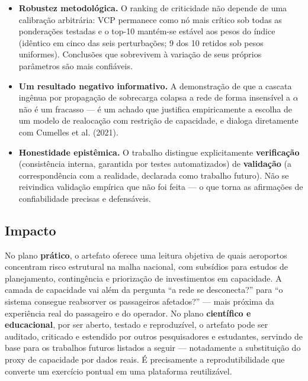 \documentclass[12pt,a4paper]{article}
\begin{document}
\begin{itemize}[leftmargin=*]
  \item \textbf{Robustez metodológica.} O ranking de criticidade não depende de uma calibração
        arbitrária: VCP permanece como nó mais crítico sob todas as ponderações testadas e o top-10
        mantém-se estável aos pesos do índice (idêntico em cinco das seis perturbações; 9 dos 10
        retidos sob pesos uniformes). Conclusões que sobrevivem à variação de seus próprios
        parâmetros são mais confiáveis.
  \item \textbf{Um resultado negativo informativo.} A demonstração de que a cascata ingênua por
        propagação de sobrecarga colapsa a rede de forma insensível a $\alpha$ não é um fracasso
        --- é um achado que justifica empiricamente a escolha de um modelo de realocação com
        restrição de capacidade, e dialoga diretamente com Cumelles et al. (2021).
  \item \textbf{Honestidade epistêmica.} O trabalho distingue explicitamente \textbf{verificação}
        (consistência interna, garantida por testes automatizados) de \textbf{validação} (a
        correspondência com a realidade, declarada como trabalho futuro). Não se reivindica
        validação empírica que não foi feita --- o que torna as afirmações de confiabilidade
        precisas e defensáveis.
\end{itemize}

\subsection{Impacto}

No plano \textbf{prático}, o artefato oferece uma leitura objetiva de quais aeroportos concentram
risco estrutural na malha nacional, com subsídios para estudos de planejamento, contingência e
priorização de investimentos em capacidade. A camada de capacidade vai além da pergunta ``a rede
se desconecta?'' para ``o sistema consegue reabsorver os passageiros afetados?'' --- mais próxima
da experiência real do passageiro e do operador. No plano \textbf{científico e educacional}, por
ser aberto, testado e reproduzível, o artefato pode ser auditado, criticado e estendido por outros
pesquisadores e estudantes, servindo de base para os trabalhos futuros listados a seguir ---
notadamente a substituição do proxy de capacidade por dados reais. É precisamente a
reprodutibilidade que converte um exercício pontual em uma plataforma reutilizável.

\end{document}
